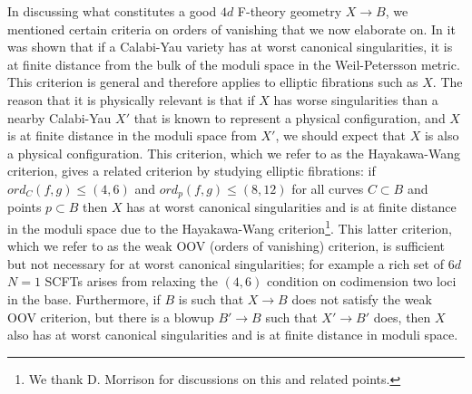\documentclass[aps,prl,twocolumn, superscriptaddress,groupedaddress,nofootinbib]{revtex4}
\begin{document}
In discussing what constitutes a good $4d$ F-theory geometry $X\to B$, we mentioned
certain criteria on orders of vanishing that we now elaborate on. In 
\cite{Hayakawa,Wang} it was shown that if a Calabi-Yau variety has at worst
canonical singularities, it is at finite distance 
from the bulk of the moduli space in the Weil-Petersson metric. 
This criterion is general and therefore applies to elliptic fibrations such as $X$.
The reason that it is physically relevant is that if $X$ has worse singularities
than a nearby Calabi-Yau $X'$ that is known to represent a physical configuration,
and $X$ is at finite distance in the moduli space from $X'$, we should expect that
$X$ is also a physical configuration. This criterion, which we refer to as the
Hayakawa-Wang criterion, gives a related criterion by studying elliptic
fibrations:
if $ord_C(f,g)\leq(4,6)$ and $ord_p(f,g)\leq(8,12)$ 
for all curves $C\subset B$ and points $p\subset B$
then  $X$ has at worst
canonical singularities and is at finite distance in the
moduli space due to the Hayakawa-Wang criterion\footnote{We thank D. Morrison for discussions on
this and related points.}. This latter criterion, which we refer to as the weak OOV (orders
of vanishing) criterion, is sufficient but not necessary for at worst canonical singularities; for example a rich set of $6d$ $N=1$
SCFTs \cite{Heckman:2013pva} arises from relaxing the $(4,6)$ condition on 
codimension two loci in the base. Furthermore, if $B$ is such that $X\to B$
does not satisfy the weak OOV criterion, but there is a blowup $B'\to B$ such
that $X'\to B'$ does, then $X$ also has at worst canonical singularities
and is at finite distance in moduli space.
\end{document}
